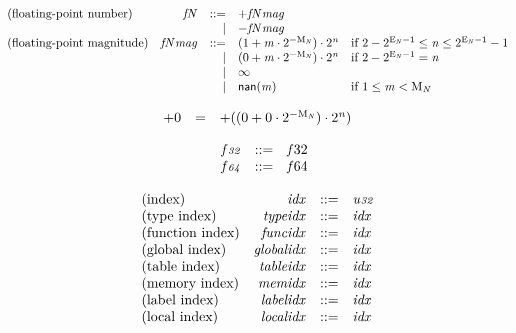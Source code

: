 $$
\begin{array}{@{}lrrl@{}l@{}}
\mbox{(floating-point number)} & {{\mathit{f}}}{{\mathit{N}}} &::=& {+{{{\mathit{f}}}{{\mathit{N}}}}{{\mathit{mag}}}} \\ &&|&
{-{{{\mathit{f}}}{{\mathit{N}}}}{{\mathit{mag}}}} \\
\mbox{(floating-point magnitude)} & {{{\mathit{f}}}{{\mathit{N}}}}{{\mathit{mag}}} &::=& (1 + {\mathit{m}} \cdot {2^{{-{{\mathrm{M}}}_{{\mathit{N}}}}}}) \cdot {2^{{\mathit{n}}}} &\quad
  \mbox{if}~2 - {2^{{{\mathrm{E}}}_{{\mathit{N}}} - 1}} \leq {\mathit{n}} \leq {2^{{{\mathrm{E}}}_{{\mathit{N}}} - 1}} - 1 \\ &&|&
(0 + {\mathit{m}} \cdot {2^{{-{{\mathrm{M}}}_{{\mathit{N}}}}}}) \cdot {2^{{\mathit{n}}}} &\quad
  \mbox{if}~2 - {2^{{{\mathrm{E}}}_{{\mathit{N}}} - 1}} = {\mathit{n}} \\ &&|&
\infty \\ &&|&
{\mathsf{nan}}{({\mathit{m}})} &\quad
  \mbox{if}~1 \leq {\mathit{m}} < {{\mathrm{M}}}_{{\mathit{N}}} \\
\end{array}
$$

$$
\begin{array}{@{}lcl@{}l@{}}
{+0} &=& {+((0 + 0 \cdot {2^{{-{{\mathrm{M}}}_{{\mathit{N}}}}}}) \cdot {2^{{\mathit{n}}}})} &  \\
\end{array}
$$

$$
\begin{array}{@{}lrrl@{}l@{}}
& {\mathit{f{\scriptstyle32}}} &::=& {{\mathit{f}}}{32} \\
& {\mathit{f{\scriptstyle64}}} &::=& {{\mathit{f}}}{64} \\
\end{array}
$$

\vspace{1ex}

$$
\begin{array}{@{}lrrl@{}l@{}}
\mbox{(index)} & {\mathit{idx}} &::=& {\mathit{u{\scriptstyle32}}} \\
\mbox{(type index)} & {\mathit{typeidx}} &::=& {\mathit{idx}} \\
\mbox{(function index)} & {\mathit{funcidx}} &::=& {\mathit{idx}} \\
\mbox{(global index)} & {\mathit{globalidx}} &::=& {\mathit{idx}} \\
\mbox{(table index)} & {\mathit{tableidx}} &::=& {\mathit{idx}} \\
\mbox{(memory index)} & {\mathit{memidx}} &::=& {\mathit{idx}} \\
\mbox{(label index)} & {\mathit{labelidx}} &::=& {\mathit{idx}} \\
\mbox{(local index)} & {\mathit{localidx}} &::=& {\mathit{idx}} \\
\end{array}
$$

